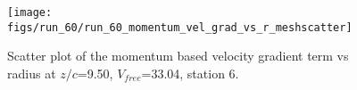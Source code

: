 \begin{figure}[H]
\centering
\texttt{[image: figs/run\_60/run\_60\_momentum\_vel\_grad\_vs\_r\_meshscatter]}
\caption{Scatter plot of the momentum based velocity gradient term vs radius at $z/c$=9.50, $V_{free}$=33.04, station 6.}
\label{fig:run_60_momentum_vel_grad_vs_r_meshscatter}
\end{figure}


